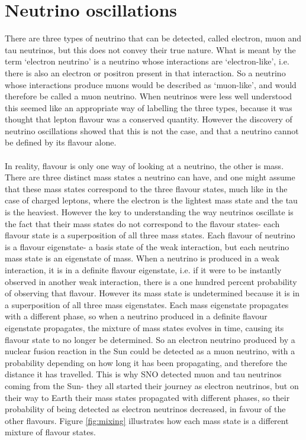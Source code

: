 \documentclass[12pt]{article}
\begin{document}
\section{Neutrino oscillations}
There are three types of neutrino that can be detected, called electron, muon and tau neutrinos, but this does not convey their true nature. What is meant by the term `electron neutrino' is a neutrino whose interactions are `electron-like', i.e. there is also an electron or positron present in that interaction. So a neutrino whose interactions produce muons would be described as `muon-like', and would therefore be called a muon neutrino. When neutrinos were less well understood this seemed like an appropriate way of labelling the three types, because it was thought that lepton flavour was a conserved quantity. However the discovery of neutrino oscillations showed that this is not the case, and that a neutrino cannot be defined by its flavour alone.\\\\
In reality, flavour is only one way of looking at a neutrino, the other is mass. There are three distinct mass states a neutrino can have, and one might assume that these mass states correspond to the three flavour states, much like in the case of charged leptons, where the electron is the lightest mass state and the tau is the heaviest. However the key to understanding the way neutrinos oscillate is the fact that their mass states do not correspond to the flavour states- each flavour state is a superposition of all three mass states. Each flavour of neutrino is a flavour eigenstate- a basis state of the weak interaction, but each neutrino mass state is an eigenstate of mass. When a neutrino is produced in a weak interaction, it is in a definite flavour eigenstate, i.e. if it were to be instantly observed in another weak interaction, there is a one hundred percent probability of observing that flavour. However its mass state is undetermined because it is in a superposition of all three mass eigenstates. Each mass eigenstate propagates with a different phase, so when a neutrino produced in a definite flavour eigenstate propagates, the mixture of mass states evolves in time, causing its flavour state to no longer be determined. So an electron neutrino produced by a nuclear fusion reaction in the Sun could be detected as a muon neutrino, with a probability depending on how long it has been propagating, and therefore the distance it has travelled. This is why SNO detected muon and tau neutrinos coming from the Sun- they all started their journey as electron neutrinos, but on their way to Earth their mass states propagated with different phases, so their probability of being detected as electron neutrinos decreased, in favour of the other flavours. Figure \ref{fig:mixing} illustrates how each mass state is a different mixture of flavour states.
\end{document}

